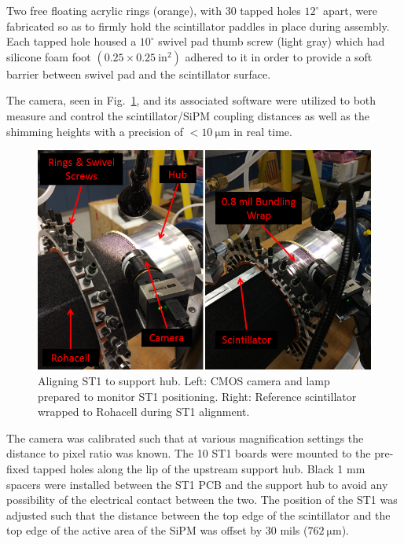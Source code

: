 Two free floating acrylic rings (orange), with 30 tapped holes $12^{\circ}$ apart, were fabricated so as to firmly hold the scintillator paddles in place during assembly. 
Each tapped hole housed a $10^{\circ}$ swivel pad thumb screw (light gray) which had silicone foam foot $(0.25 \times 0.25\ \mathrm{in^{2}})$ adhered to it in order to provide a soft barrier between swivel pad and the scintillator surface. 

The camera, seen in Fig.~\ref{fig:aligning_st1_to_hub}, and its associated software were utilized to both measure and control the scintillator/SiPM coupling distances as well as the shimming heights with a precision of $\mathrm{< 10\ \mu m}$ in real time. 
	\begin{figure}[!htb]
		\centering
		\includegraphics[width=1.0\columnwidth]{fabrication/figs/aligning_st1_to_hub}
		\caption{Aligning ST1 to support hub.  Left: CMOS camera and lamp prepared to monitor ST1 positioning.  Right: Reference scintillator wrapped to Rohacell during ST1 alignment.}
		\label{fig:aligning_st1_to_hub}
	\end{figure}
The camera was calibrated such that at various magnification settings the distance to pixel ratio was known.  The 10 ST1 boards were mounted to the pre-fixed tapped holes along the lip of the upstream support hub.  Black 1 mm spacers were installed between the ST1 PCB and the support hub to avoid any possibility of the electrical contact between the two.  The position of the ST1 was adjusted such that the distance between the top edge of the scintillator and the top edge of the active area of the SiPM was offset by 30 mils ($\mathrm{762\ \mu m}$).  %

